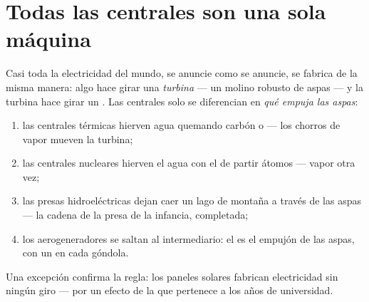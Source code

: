 \section{Todas las centrales son una sola máquina}

\begin{proposition}\label{prop:g9:alternator:core}
Casi toda la electricidad del mundo, se anuncie como se anuncie, se
fabrica de la misma manera: algo hace girar una \emph{turbina} --- un
molino robusto de aspas --- y la turbina hace girar un
. Las centrales solo se diferencian en \emph{qué empuja
las aspas}:
\begin{enumerate}
  \item las centrales térmicas hierven agua quemando carbón o 
        --- los chorros de vapor mueven la turbina;
  \item las centrales nucleares hierven el agua con el
         de partir átomos --- vapor otra vez;
  \item las presas hidroeléctricas dejan caer un lago de montaña a
        través de las aspas --- la cadena de la presa de la infancia,
        completada;
  \item los aerogeneradores se saltan al intermediario: el
         es el empujón de las aspas, con un
         en cada góndola.
\end{enumerate}
Una excepción confirma la regla: los paneles solares fabrican
electricidad sin ningún giro --- por un efecto de la  que
pertenece a los años de universidad.
\end{proposition}


